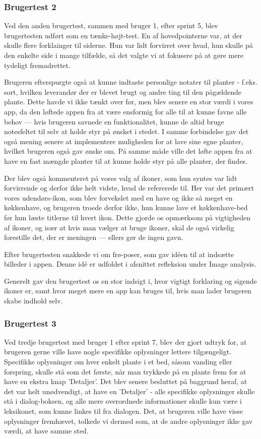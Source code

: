 \subsubsection{Brugertest 2}

Ved den anden brugertest, sammen med bruger 1, efter sprint 5, blev brugertesten udført som en tænke-højt-test. En af hovedpointerne var, at der skulle flere forklainger til siderne. Hun var lidt forvirret over hvad, hun skulle på den enkelte side i mange tilfælde, så det valgte vi at fokusere på at gøre mere tydeligt fremadrettet.

Brugeren efterspurgte også at kunne indtaste personlige notater til planter - f.eks. sort, hvilken leverandør der er blevet brugt og andre ting til den pågældende plante. Dette havde vi ikke tænkt over før, men blev senere en stor værdi i vores app, da den løftede appen fra at være ensformig for alle til at kunne favne alle behov --- hvis brugeren savnede en funktionalitet, kunne de altid bruge notesfeltet til selv at holde styr på ønsket i stedet. I samme forbindelse gav det også mening senere at implementere muligheden for at lave sine egne planter, hvilket brugeren også gav ønske om. På samme måde ville det løfte appen fra at have en fast mængde planter til at kunne holde styr på alle planter, der findes.

Der blev også kommenteret på vores valg af ikoner, som hun syntes var lidt forvirrende og derfor ikke helt vidste, hvad de refererede til. Her var det primært vores udendørs-ikon, som blev forvekslet med en have og ikke så meget en køkkenhave, og brugeren troede derfor ikke, hun kunne lave et køkkenhave-bed før hun læste titlerne til hvert ikon. Dette gjorde os opmærksom på vigtigheden af ikoner, og især at hvis man vælger at bruge ikoner, skal de også virkelig forestille det, der er meningen --- ellers gør de ingen gavn.

Efter brugertesten snakkede vi om frø-poser, som gav idéen til at indsætte billeder i appen. Denne idé er udfoldet i afsnittet refleksion under Image analysis.

Generelt gav den brugertest os en stor indsigt i, hvor vigtigt forklaring og sigende ikoner er, samt hvor meget mere en app kan bruges til, hvis man lader brugeren skabe indhold selv.

\subsubsection{Brugertest 3}

Ved tredje brugertest med bruger 1 efter sprint 7, blev der gjort udtryk for, at brugeren gerne ville have nogle specifikke oplysninger lettere tilgængeligt. Specifikke oplysninger om hver enkelt plante i et bed, såsom vanding eller forspring, skulle stå som det første, når man trykkede på en plante frem for at have en ekstra knap 'Detaljer'. Det blev senere besluttet på baggrund heraf, at det var helt unødvendigt, at have en 'Detaljer' - alle specifikke oplysninger skulle stå i dialog-boksen, og alle mere overordnede informationer skulle kun være i leksikonet, som kunne linkes til fra dialogen. Det, at brugeren ville have visse oplysninger fremhævet, tolkede vi dermed som, at de andre oplysninger ikke gav værdi, at have samme sted.

